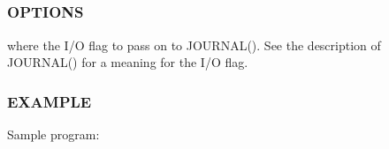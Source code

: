 \subparagraph*{}

\subparagraph*{}

\subsubsection*{O\+P\+T\+I\+O\+NS}

\begin{DoxyVerb}   where    the I/O flag to pass on to JOURNAL().
            See the description of JOURNAL() for a meaning for the I/O flag.
\end{DoxyVerb}


\subsubsection*{E\+X\+A\+M\+P\+LE}

Sample program\+:

